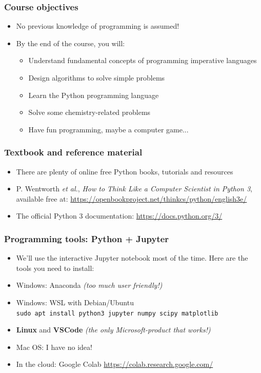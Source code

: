 \documentclass{beamer}
\begin{document}
\begin{frame}[fragile]
  \frametitle{Course objectives}
  \begin{itemize}
  \item No previous knowledge of programming is assumed!\pause
  \item By the end of the course, you will:\pause
        \begin{itemize}
        \item Understand fundamental concepts of programming imperative languages
        \item Design algorithms to solve simple problems
        \item Learn the Python programming language
        \item Solve some chemistry-related problems
        \item Have fun programming, maybe a computer game...
        \end{itemize}
  \end{itemize}
\end{frame}

\begin{frame}[fragile]
  \frametitle{Textbook and reference material}
  \begin{itemize}
  \item There are plenty of online free Python books, tutorials and resources
  \item P. Wentworth \emph{et al.}, \emph{How to Think Like a Computer Scientist in Python 3}, 
        available free at: \url{https://openbookproject.net/thinkcs/python/english3e/}
  \item The official Python 3 documentation: \url{https://docs.python.org/3/}
  \end{itemize}
\end{frame}

\begin{frame}[fragile]
  \frametitle{Programming tools: Python + Jupyter}
  \begin{itemize}
  \item We'll use the interactive Jupyter notebook most of the time. Here are the tools you need to install:\pause
  \item Windows: Anaconda \textsl{\small{(too much user friendly!)}}\pause
  \item Windows: WSL with Debian/Ubuntu\\
       \verb|sudo apt install python3 jupyter numpy scipy matplotlib|
  \item \textbf{Linux} and \textbf{VSCode} \textsl{\small{(the only Microsoft-product that works!)}}\pause
  \item Mac OS: I have no idea!\pause
  \item In the cloud: Google Colab \url{https://colab.research.google.com/}
  \end{itemize}
\end{frame}
 
\end{document}
